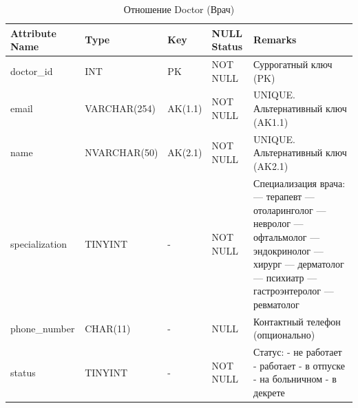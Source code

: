 \documentclass[a4paper, 14pt]{extarticle}
\begin{document}
\begin{table}[h!]
\captionsetup{singlelinecheck=false, position=top}
\caption{Отношение Doctor (Врач)}
\begin{tabularx}{\textwidth}{|l|l|l|l|Y|}
\hline
  \textbf{Attribute Name} & \textbf{Type} & \textbf{Key} & \textbf{NULL Status} & \textbf{Remarks}\\
\hline
  doctor\_id & INT & PK & NOT NULL & Суррогатный ключ (PK)\\
\hline
email & VARCHAR(254) & AK(1.1) & NOT NULL & UNIQUE. Альтернативный ключ (AK1.1)\\
\hline
name & NVARCHAR(50) & AK(2.1) & NOT NULL & UNIQUE. Альтернативный ключ (AK2.1)\\
\hline
specialization & TINYINT & - & NOT NULL & Специализация врача:  — терапевт  — отоларинголог  — невролог  — офтальмолог  — эндокринолог  — хирург  — дерматолог  — психиатр  — гастроэнтеролог  — ревматолог \newline
\\
\hline
phone\_number & CHAR(11) & - & NULL & Контактный телефон (опционально)\\
\hline
status & TINYINT & - & NOT NULL & Статус:  - не работает  - работает  - в отпуске  - на больничном  - в декрете
\\
\hline
\end{tabularx}
\end{table}
\end{document}

